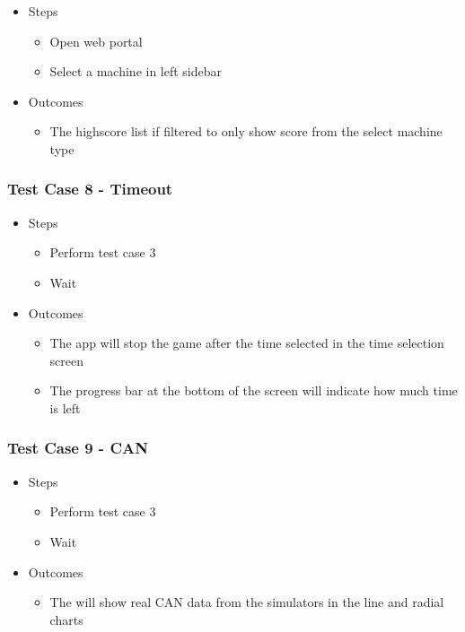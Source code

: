 \documentclass{article}
\begin{document}
\begin{itemize}
\item Steps
\begin{itemize}
\item Open web portal
\item Select a machine in left sidebar
\end{itemize}
\item Outcomes
\begin{itemize}
\item The highscore list if filtered to only show score from the select machine type
\end{itemize}
\end{itemize}

\subsubsection*{Test Case 8 - Timeout}

\begin{itemize}
\item Steps
\begin{itemize}
\item Perform test case 3
\item Wait
\end{itemize}
\item Outcomes
\begin{itemize}
\item The app will stop the game after the time selected in the time selection screen
\item The progress bar at the bottom of the screen will indicate how much time is left
\end{itemize}
\end{itemize}

\subsubsection*{Test Case 9 - CAN}

\begin{itemize}
\item Steps
\begin{itemize}
\item Perform test case 3
\item Wait
\end{itemize}
\item Outcomes
\begin{itemize}
\item The will show real CAN data from the simulators in the line and radial charts
\end{itemize}
\end{itemize}
\end{document}
